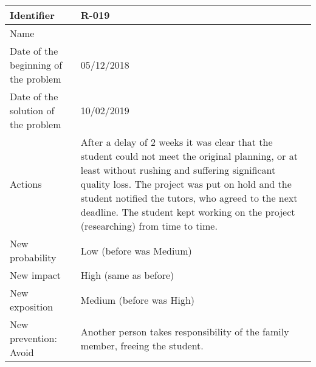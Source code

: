 \begin{table}[H]
	\begin{tabularx}{\textwidth}{|l|X|}
		\hline
		\rowcolor{gray!30}
		Identifier & \textbf{R-019} \\ \hline
		Name & \Rdiecinueve \\ \hline
		Date of the beginning of the problem & 05/12/2018 \\ \hline
		Date of the solution of the problem & 10/02/2019 \\ \hline
		Actions & After a delay of 2 weeks it was clear that the student could not meet the original planning, or at least without rushing and suffering significant quality loss. \linej
			The project was put on hold and the student notified the tutors, who agreed to the next deadline. \linej
			The student kept working on the project (researching) from time to time. \\ \hline
		New probability & Low (before was Medium) \\ \hline
		New impact &  High (same as before) \\ \hline
		New exposition & Medium (before was High) \\ \hline
		New prevention: Avoid &
			Another person takes responsibility of the family member, freeing the student.
		\\ \hline
	\end{tabularx}
\end{table}
